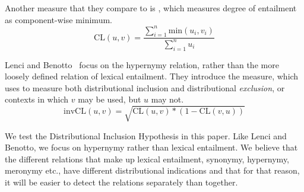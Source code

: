 Another measure that they compare to is {\ClarkeDE} \cite{clarke:2009:GEMS}, which
measures degree of entailment as component-wise minimum.
\begin{equation*}
  \mbox{CL}(u, v) = \frac{\sum_{i=1}^n \mbox{min}(u_i, v_i)}{\sum_{i=1}^n u_i}
\end{equation*}

Lenci and Benotto~ focus on the hypernymy
relation, rather than the more loosely defined relation of lexical
entailment. They introduce the {\invCL} measure, which uses
{\ClarkeDE} to measure both distributional inclusion and distributional {\em exclusion}, or contexts in which
$v$ may be used, but $u$ may not. 
\begin{equation*}
  \mbox{invCL}(u, v) = \sqrt{\mbox{CL}(u, v) * (1 - \mbox{CL}(v, u))}
\end{equation*}

We test the Distributional Inclusion Hypothesis in this paper.
Like Lenci and Benotto, we focus on hypernymy rather than lexical
entailment. We believe that the different relations that make up
lexical entailment, synonymy, hypernymy, meronymy etc., have different
distributional indications and that for that reason, it will be easier
to detect the relations separately than together. 



